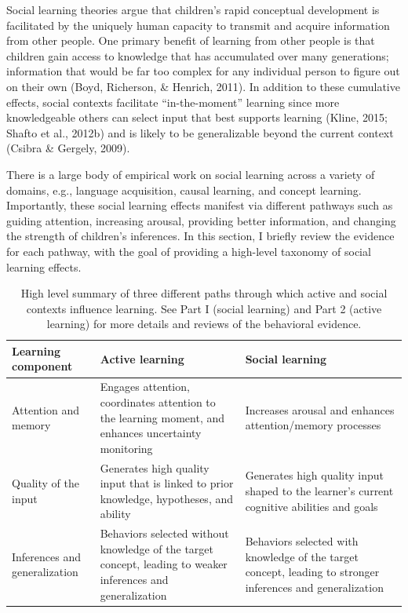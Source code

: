 \documentclass[english,floatsintext,man]{apa6}
\theoremstyle{definition}
\theoremstyle{definition}
\theoremstyle{definition}
\theoremstyle{remark}
\begin{document}
Social learning theories argue that children's rapid conceptual
development is facilitated by the uniquely human capacity to transmit
and acquire information from other people. One primary benefit of
learning from other people is that children gain access to knowledge
that has accumulated over many generations; information that would be
far too complex for any individual person to figure out on their own
(Boyd, Richerson, \& Henrich, 2011). In addition to these cumulative
effects, social contexts facilitate \enquote{in-the-moment} learning
since more knowledgeable others can select input that best supports
learning (Kline, 2015; Shafto et al., 2012b) and is likely to be
generalizable beyond the current context (Csibra \& Gergely, 2009).

There is a large body of empirical work on social learning across a
variety of domains, e.g., language acquisition, causal learning, and
concept learning. Importantly, these social learning effects manifest
via different pathways such as guiding attention, increasing arousal,
providing better information, and changing the strength of children's
inferences. In this section, I briefly review the evidence for each
pathway, with the goal of providing a high-level taxonomy of social
learning effects.

\begin{table}[tb]
\centering
\caption{High level summary of three different paths through which active and social contexts influence learning. See Part I (social learning) and Part 2 (active learning) for more details and reviews of the behavioral evidence.} 
\label{act_soc}
\begin{tabular}{p{1.5in}|p{2in}|p{2in}}
 {\textbf{Learning component}} & {\textbf{Active learning}} & {\textbf{Social learning}} \\ 
  \hline
Attention and memory & Engages attention, coordinates attention to the learning moment, and enhances uncertainty monitoring & Increases arousal and enhances attention/memory processes \\ 
   \hline
Quality of the input & Generates high quality input that is linked to prior knowledge,  hypotheses, and ability & Generates high quality input shaped to the learner's current cognitive abilities and goals \\ 
   \hline
Inferences and generalization & Behaviors selected without knowledge of the target concept, leading to weaker inferences and generalization & Behaviors selected with knowledge of the target concept, leading to stronger inferences and generalization \\ 
   \hline
\end{tabular}
\end{table}
\end{document}
